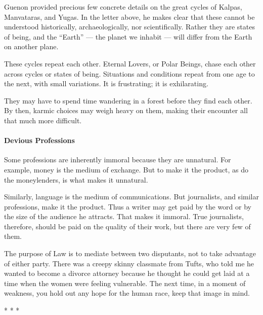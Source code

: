 Guenon provided precious few concrete details on the great cycles of Kalpas, Manvataras, and Yugas. In the letter above, he makes clear that these cannot be understood historically, archaeologically, nor scientifically. Rather they are states of being, and the ``Earth'' --- the planet we inhabit --- will differ from the Earth on another plane.

These cycles repeat each other. Eternal Lovers, or Polar Beings, chase each other across cycles or states of being. Situations and conditions repeat from one age to the next, with small variations. It is frustrating; it is exhilarating.

They may have to spend time wandering in a forest before they find each other. By then, karmic choices may weigh heavy on them, making their encounter all that much more difficult.

\paragraph{Devious Professions}


Some professions are inherently immoral because they are unnatural. For example, money is the medium of exchange. But to make it the product, as do the moneylenders, is what makes it unnatural.

Similarly, language is the medium of communications. But journalists, and similar professions, make it the product. Thus a writer may get paid by the word or by the size of the audience he attracts. That makes it immoral. True journalists, therefore, should be paid on the quality of their work, but there are very few of them.

The purpose of Law is to mediate between two disputants, not to take advantage of either party. There was a creepy skinny classmate from Tufts, who told me he wanted to become a divorce attorney because he thought he could get laid at a time when the women were feeling vulnerable. The next time, in a moment of weakness, you hold out any hope for the human race, keep that image in mind.



\begin{center}* * *\end{center}


